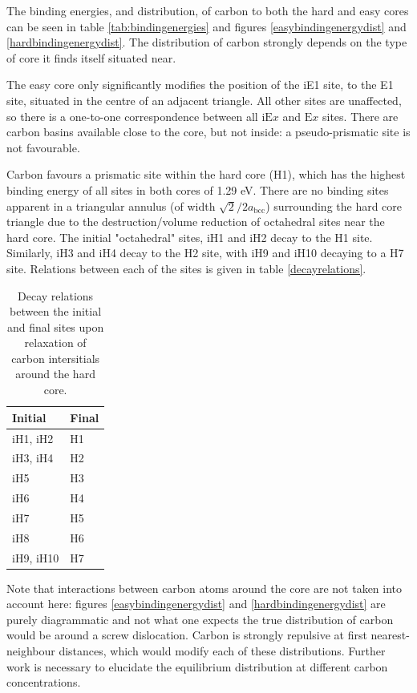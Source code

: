 \documentclass[a4paper,11pt]{article}
\begin{document}
The binding energies, and distribution, of carbon to both the hard and easy cores can be seen in table
\ref{tab:bindingenergies} and figures \ref{easybindingenergydist} and \ref{hardbindingenergydist}. The
distribution of carbon strongly depends on the type of core it finds itself situated near. 

The easy core only significantly modifies the position of the iE1 site, to the E1 site, situated
in the centre of an adjacent triangle. All other sites are unaffected, so there is a one-to-one
correspondence between all \(\text{iE}x\) and \(\text{E}x\) sites. There are carbon basins available
close to the core, but not inside: a pseudo-prismatic site is not favourable.

Carbon favours a prismatic site within the hard core (H1), which has the highest
binding energy of all sites in both cores of 1.29 eV. There are no binding sites apparent in a triangular
annulus (of width \(\sqrt{2}/2 a_{\text{bcc}}\)) surrounding the hard core triangle due to the
destruction/volume reduction of octahedral sites near the hard core. The initial "octahedral"
sites, iH1 and iH2 decay to the H1 site. Similarly, iH3 and iH4 decay to the H2 site, with iH9
and iH10 decaying to a H7 site. Relations between each of the sites is given in table
\ref{decayrelations}.

\begin{table}[htbp]
\caption{\label{tab:orgca195f9}
Decay relations between the initial and final sites upon relaxation of carbon intersitials around the hard core.}
\centering
\begin{tabular}{ll}
Initial & Final\\
\hline
iH1, iH2 & H1\\
iH3, iH4 & H2\\
iH5 & H3\\
iH6 & H4\\
iH7 & H5\\
iH8 & H6\\
iH9, iH10 & H7\\
\end{tabular}
\end{table}


Note that interactions between carbon atoms around the core are not taken into account here:
figures \ref{easybindingenergydist} and \ref{hardbindingenergydist} are purely diagrammatic and not
what one expects the true distribution of carbon would be around a screw dislocation. Carbon is strongly
repulsive at first nearest-neighbour distances, which would modify each of these
distributions. Further work is necessary to elucidate the equilibrium distribution at different
carbon concentrations. 
\end{document}
